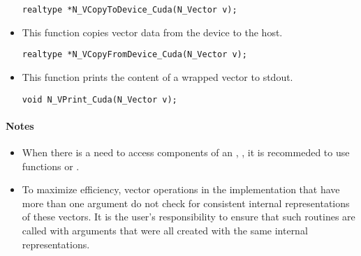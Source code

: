 \begin{itemize}
 \verb|realtype *N_VCopyToDevice_Cuda(N_Vector v);|



\item {}
 
 This function copies vector data from the device to the host.

 \verb|realtype *N_VCopyFromDevice_Cuda(N_Vector v);|



\item {}
  
  This function prints the content of a wrapped {\cuda} vector to stdout.
 
    
  \verb|void N_VPrint_Cuda(N_Vector v);|


\end{itemize}
\paragraph{\bf Notes} 
           
\begin{itemize}
                                        
\item
  When there is a need to access components of an , , 
  it is recommeded to use functions  or 
  .        
                                                               

\item
  {\warn}To maximize efficiency, vector operations in the {\nveccuda} implementation
  that have more than one  argument do not check for
  consistent internal representations of these vectors. It is the user's 
  responsibility to ensure that such routines are called with 
  arguments that were all created with the same internal representations.

\end{itemize}

